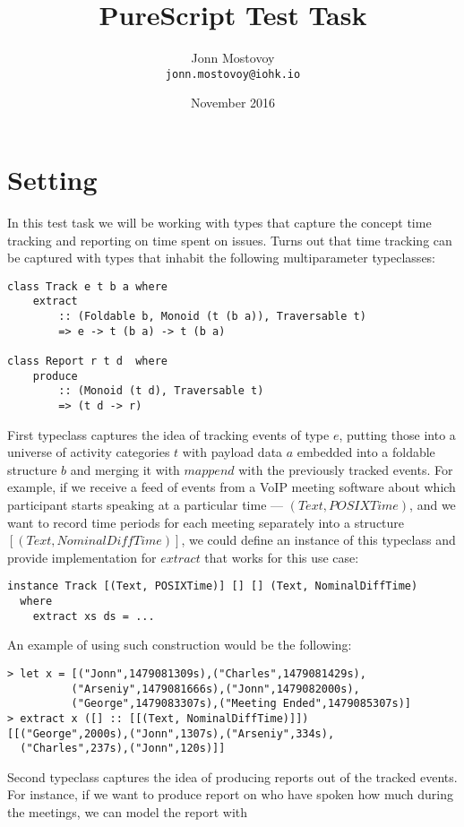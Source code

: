 \documentclass{article}
\title{PureScript Test Task}
\author{
    Jonn Mostovoy\\
    \texttt{jonn.mostovoy@iohk.io}
}
\date{November 2016}
\begin{document}
\maketitle

\section{Setting}

In this test task we will be working with types that capture the concept time tracking
and reporting on time spent on issues.
Turns out that time tracking can be captured with types that inhabit the following 
multiparameter typeclasses:

\begin{verbatim}
class Track e t b a where
    extract
        :: (Foldable b, Monoid (t (b a)), Traversable t)
        => e -> t (b a) -> t (b a)

class Report r t d  where
    produce
        :: (Monoid (t d), Traversable t)
        => (t d -> r)
\end{verbatim}
First typeclass captures the idea of tracking events of type $ e $, putting those into a universe of activity
categories $ t $ with payload data $ a $ embedded into a foldable structure $ b $ and merging it with $ mappend $ with
the previously tracked events.
For example, if we receive a feed of events from a VoIP meeting software about which participant starts
speaking at a particular time — $ (Text, POSIXTime) $, and we want to record time periods for each meeting
separately into a structure \\$ [ (Text, NominalDiffTime) ] $, we could define an instance of this typeclass
and provide implementation for $ extract $ that works for this use case:
\begin{verbatim}
instance Track [(Text, POSIXTime)] [] [] (Text, NominalDiffTime)
  where
    extract xs ds = ...
\end{verbatim}
An example of using such construction would be the following:
\begin{verbatim}
> let x = [("Jonn",1479081309s),("Charles",1479081429s),
          ("Arseniy",1479081666s),("Jonn",1479082000s),
          ("George",1479083307s),("Meeting Ended",1479085307s)]
> extract x ([] :: [[(Text, NominalDiffTime)]])
[[("George",2000s),("Jonn",1307s),("Arseniy",334s),
  ("Charles",237s),("Jonn",120s)]]
\end{verbatim}
Second typeclass captures the idea of producing reports out of the tracked events. For instance, if we
want to produce report on who have spoken how much during the meetings, we can model the report with
\end{document}
